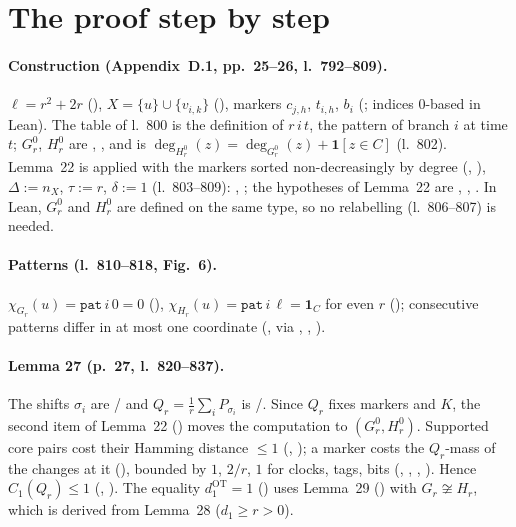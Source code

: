 \section{The proof step by step}

\paragraph{Construction (Appendix~D.1, pp.~25--26, l.~792--809).} $\ell=r^2+2r$ (),
$X=\{u\}\cup\{v_{i,k}\}$ (), markers $c_{j,h}$, $t_{i,h}$, $b_i$ (; indices 0-based in
Lean). The table of l.~800 is the definition of  $r\,i\,t$, the pattern of branch $i$ at time $t$;
$G^0_r$, $H^0_r$ are , , and  is
$\deg_{H^0_r}(z)=\deg_{G^0_r}(z)+\mathbf 1[z\in C]$ (l.~802). Lemma~22 is applied with the markers sorted
non-decreasingly by degree (, ), $\Delta:=n_X$, $\tau:=r$, $\delta:=1$
(l.~803--809): , ; the hypotheses of Lemma~22 are ,
, . In Lean, $G^0_r$ and $H^0_r$ are defined on the same type, so no
relabelling (l.~806--807) is needed.

\paragraph{Patterns (l.~810--818, Fig.~6).} $\chi_{G_r}(u)=\mathtt{pat}\,i\,0=0$ (),
$\chi_{H_r}(u)=\mathtt{pat}\,i\,\ell=\mathbf 1_C$ for even $r$ (); consecutive patterns differ in
at most one coordinate (, via , ,
).

\paragraph{Lemma 27 (p.~27, l.~820--837).} The shifts $\sigma_i$ are / and
$Q_r=\frac1r\sum_iP_{\sigma_i}$ is /. Since $Q_r$ fixes markers and $K$, the second item of
Lemma~22 () moves the computation to $(G^0_r,H^0_r)$. Supported core pairs cost their
Hamming distance $\le1$ (, ); a marker costs the
$Q_r$-mass of the changes at it (), bounded by $1$, $2/r$, $1$ for clocks, tags,
bits (, , , ). Hence
$C_1(Q_r)\le1$ (, ). The equality
$d_1^{\mathrm{OT}}=1$ () uses Lemma~29 () with $G_r\not\cong H_r$,
which is derived from Lemma~28 ($d_1\ge r>0$).

